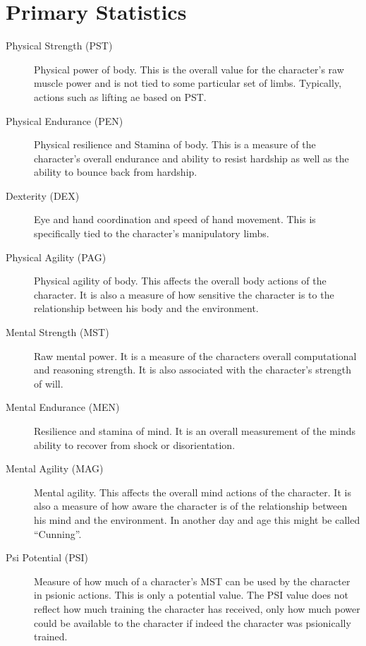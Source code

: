 \section{Primary Statistics}
\begin{description}
	\item[Physical Strength		(PST)]
	Physical power of body. This is the overall value for the character's
	raw muscle power and is not tied to some particular set of limbs. 
	Typically, actions such as lifting ae based on PST.
	\item[Physical Endurance		(PEN)]
	Physical resilience and Stamina of body. This is a measure of the
	character's overall endurance and ability to resist hardship as 
	well as the ability to bounce back from hardship.
	\item[Dexterity				(DEX)]
	Eye and hand coordination and speed of hand movement. This is
	specifically tied to the character's manipulatory limbs. 
	\item[Physical Agility		(PAG)]
	Physical agility of body. This affects the overall body actions of the
	character. It is also a measure of how sensitive the character is to
	the relationship between his body and the environment.
	\item[Mental Strength		(MST)]
	Raw mental power. It is a measure of the characters overall
	computational and reasoning strength. It is also associated with 
	the character's strength of will. 
	\item[Mental Endurance		(MEN)]
	Resilience and stamina of mind. It is an overall measurement of the
	minds ability to recover from shock or disorientation. 
	\item[Mental Agility			(MAG)]
	Mental agility. This affects the overall mind actions of the
	character. It is also a measure of how aware the character is of the
	relationship between his mind and the environment. In another day and
	age this might be called ``Cunning''.
	\item[Psi Potential	(PSI)]
	Measure of how much of a character's MST can be used by the 
	character in psionic actions. This is only a potential value.
	The PSI value does not reflect how much training the character 
	has received, only how much power could be available to the 
	character if indeed the character was psionically trained. 
\end{description}


